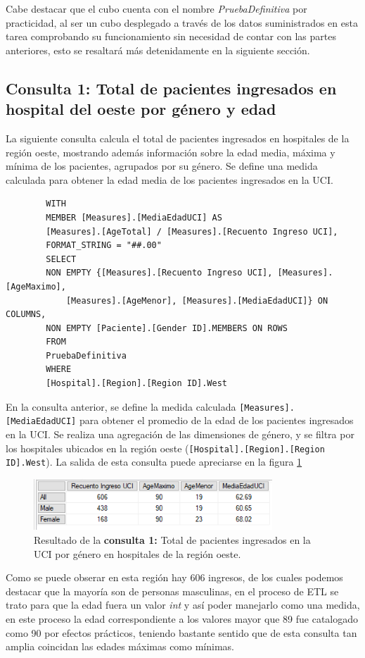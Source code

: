 \documentclass[12pt, a4paper, twoside]{article}
\begin{document}
	Cabe destacar que el cubo cuenta con el nombre \textit{PruebaDefinitiva} por practicidad, al ser un cubo desplegado a través de los datos suministrados en esta tarea comprobando su funcionamiento sin necesidad de contar con las partes anteriores, esto se resaltará más detenidamente en la siguiente sección.
	
	\subsection{Consulta 1: Total de pacientes ingresados en hospital del oeste por género y edad}
	La siguiente consulta calcula el total de pacientes ingresados en hospitales de la región oeste, mostrando además información sobre la edad media, máxima y mínima de los pacientes, agrupados por su género. Se define una medida calculada para obtener la edad media de los pacientes ingresados en la UCI.
	
	\begin{verbatim}
		WITH 
		MEMBER [Measures].[MediaEdadUCI] AS
		[Measures].[AgeTotal] / [Measures].[Recuento Ingreso UCI],
		FORMAT_STRING = "##.00"
		SELECT 
		NON EMPTY {[Measures].[Recuento Ingreso UCI], [Measures].[AgeMaximo],
			[Measures].[AgeMenor], [Measures].[MediaEdadUCI]} ON COLUMNS, 
		NON EMPTY [Paciente].[Gender ID].MEMBERS ON ROWS
		FROM 
		PruebaDefinitiva
		WHERE 
		[Hospital].[Region].[Region ID].West
	\end{verbatim}
	En la consulta anterior, se define la medida calculada \texttt{[Measures].[MediaEdadUCI]} para obtener el promedio de la edad de los pacientes ingresados en la UCI. Se realiza una agregación de las dimensiones de género, y se filtra por los hospitales ubicados en la región oeste (\texttt{[Hospital].[Region].[Region ID].West}). La salida de esta consulta puede apreciarse en la figura \ref{fig:consulta1}
	\begin{figure}[H]
		\centering
		\includegraphics[width=0.8\textwidth]{image/consulta1.png}
		\caption{Resultado de la  \textbf{consulta 1:}  Total de pacientes ingresados en la UCI por género en hospitales de la región oeste.}
		\label{fig:consulta1}
	\end{figure}
	
	Como se puede obserar en esta región hay 606 ingresos, de los cuales podemos destacar que la mayoría son de personas masculinas, en el proceso de ETL se trato para que la edad fuera un valor \textit{int} y así poder manejarlo como una medida, en este proceso la edad correspondiente a los valores mayor que 89 fue catalogado como 90 por efectos prácticos, teniendo bastante sentido que de esta consulta tan amplia coincidan las edades máximas como mínimas. 
	
\end{document}
